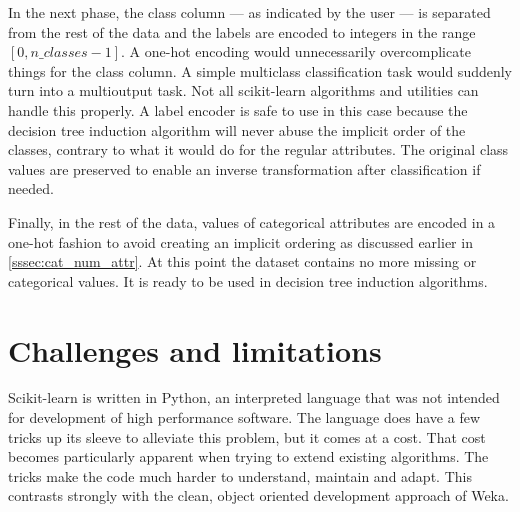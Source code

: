 In the next phase, the class column --- as indicated by the user --- is separated from the rest of the data and the labels are encoded to integers in the range $[0, n\_classes - 1]$. A one-hot encoding would unnecessarily overcomplicate things for the class column. A simple multiclass classification task would suddenly turn into a multioutput task. Not all scikit-learn algorithms and utilities can handle this properly. A label encoder is safe to use in this case because the decision tree induction algorithm will never abuse the implicit order of the classes, contrary to what it would do for the regular attributes. The original class values are preserved to enable an inverse transformation after classification if needed. 

Finally, in the rest of the data, values of categorical attributes are encoded in a one-hot fashion to avoid creating an implicit ordering as discussed earlier in \autoref{sssec:cat_num_attr}. At this point the dataset contains no more missing or categorical values. It is ready to be used in decision tree induction algorithms.


\section{Challenges and limitations}
Scikit-learn is written in Python, an interpreted language that was not intended for development of high performance software. The language does have a few tricks up its sleeve to alleviate this problem, but it comes at a cost. That cost becomes particularly apparent when trying to extend existing algorithms. The tricks make the code much harder to understand, maintain and adapt. This contrasts strongly with the clean, object oriented development approach of Weka.

